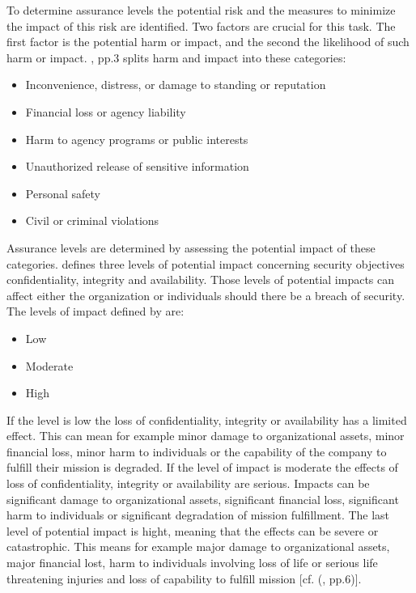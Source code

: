 To determine assurance levels the potential risk and the measures to minimize the impact of this risk are identified. Two factors are crucial for this task. The first factor is the potential harm or impact, and the second the likelihood of such harm or impact. \cite{Bolton:2003:EAuth}, pp.3 splits harm and impact into these categories:

\begin{itemize}
	\item Inconvenience, distress, or damage to standing or reputation
	\item Financial loss or agency liability
	\item Harm to agency programs or public interests
	\item Unauthorized release of sensitive information
	\item Personal safety
	\item Civil or criminal violations
\end{itemize}

Assurance levels are determined by assessing the potential impact of these categories. \cite{NIST:2004:FIOPS} defines three levels of potential impact concerning security objectives confidentiality, integrity and availability. Those levels of potential impacts can affect either the organization or individuals should there be a breach of security. The levels of impact defined by \cite{NIST:2004:FIOPS} are:

\begin{itemize}
	\item Low
	\item Moderate
	\item High
\end{itemize}


If the level is low  the loss of confidentiality, integrity or availability has a limited effect. This can mean for example minor damage to organizational assets, minor financial loss, minor harm to individuals or the capability of the company to fulfill their mission is degraded. If the level of impact is moderate the effects of loss of confidentiality, integrity or availability are serious. Impacts can be significant damage to organizational assets, significant financial loss, significant harm to individuals or significant degradation of mission fulfillment. The last level of potential impact is hight, meaning that the effects can be severe or catastrophic. This means for example major damage to organizational assets, major financial lost, harm to individuals involving loss of life or serious life threatening injuries and loss of capability to fulfill mission [cf. (\cite{NIST:2004:FIOPS}, pp.6)].



